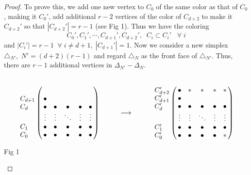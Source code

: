 \documentclass[11pt]{amsart}
\def\t{\triangle}
\begin{document}
\begin{proof}
To prove this, we add one new vertex to $C_0$ of the same color as that of  $C_0$, making it $C_0'$, add additional $r-2$ vertices of the color of $C_{d+2}$ to make it $C_{d+2}'$ so that $|C_{d+2}'|=r-1$ (see Fig 1). Thus we have the coloring
$$ C_0', C_1',\cdots , C_{d+1}', C_{d+2}',\;\;C_i\subset C_i'\;\;\;\forall \; i$$
and $|C_i'|=r-1\;\;\forall\;i\neq d+1,\;|C_{d+1}'|=1$. Now we consider a new simplex $\t_{N'},\;N'=(d+2)(r-1)$ and regard $\t_N$ as the front face of $\t_{N'}$. Thus, there are $r-1$ additional vertices in $\Delta_{N'}-\Delta_N$.

$$\bordermatrix{ & & &  &  & \cr
& & &  & &  \cr
 C_{d+1} & \bullet &   &\cr
  C_{d} & \bullet &  \bullet &  \bullet  &  \bullet &  \bullet  \cr
                & \vdots & \vdots & \ddots & \vdots & \vdots\cr
                C_{1} & \bullet &  \bullet &  \bullet  &  \bullet &  \bullet  \cr
                C_{0} & \bullet &  \bullet &  \bullet  &  \bullet &  \bullet  } \hspace{1cm}\longrightarrow \hspace{1cm} \bordermatrix{ & & &  &  & \cr
                              C_{d+2}' & \bullet  &  *  &  *  &  *  &  *  \cr
                 C_{d+1}' & \bullet &   &\cr
                  C_{d}' & \bullet &  \bullet &  \bullet  &  \bullet &  \bullet \cr
                                & \vdots & \vdots & \ddots & \vdots & \vdots\cr
                                C_{1}' & \bullet &  \bullet &  \bullet  &  \bullet &  \bullet \cr
                                C_{0}' & \bullet &  \bullet &  \bullet  &  \bullet &  *  } $$

\begin{center} Fig 1  \end{center}


\end{proof}
\end{document}
